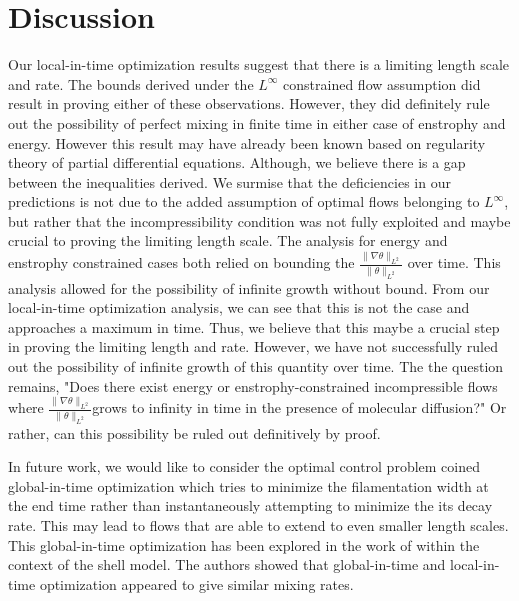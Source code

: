 \documentclass{jfm}
\newcommand{\ltwo}[1]{\|#1\|_{L^{2}}}
\newcommand{\hone}[1]{\| \nabla #1\|_{L^{2}}}
\begin{document}

\section{Discussion}
\label{sec:discussion}
Our local-in-time optimization results suggest that there is a limiting length scale and rate. The bounds derived under the $L^{\infty}$ constrained flow assumption did result in proving either of these observations. However, they did definitely rule out the possibility of perfect mixing in finite time in either case of enstrophy and energy. However this result may have already been known based on regularity theory of partial differential equations.  Although, we believe there is a gap between the inequalities derived. We surmise that the deficiencies in our predictions is not due to the added assumption of optimal flows belonging to $L^{\infty}$, but rather that the incompressibility condition was not fully exploited and maybe crucial to proving the limiting length scale. The analysis for energy and enstrophy constrained cases both relied on bounding the $\frac{\hone{\theta}}{\ltwo{\theta}}$ over time. This analysis allowed for the possibility of infinite growth without bound. From our local-in-time optimization analysis, we can see that this is not the case and approaches a maximum in time. Thus, we believe that this maybe a crucial step in proving the limiting length and rate. However, we have not successfully ruled out the possibility of infinite growth of this quantity over time. The the question remains, "Does there exist energy or enstrophy-constrained incompressible flows where $\frac{\hone{\theta}}{\ltwo{\theta}}$grows to infinity in time in the presence of molecular diffusion?" Or rather, can this possibility be ruled out definitively by proof.


In future work, we would like to consider the optimal control problem coined global-in-time optimization which tries to minimize the filamentation width at the end time rather than instantaneously attempting to minimize the its decay rate. This may lead to flows that are able to extend to even smaller length scales. This global-in-time optimization has been explored in the work of \cite{Miles2017a} within the context of the shell model. The authors showed that global-in-time and local-in-time optimization appeared to give similar mixing rates. 
\end{document}
